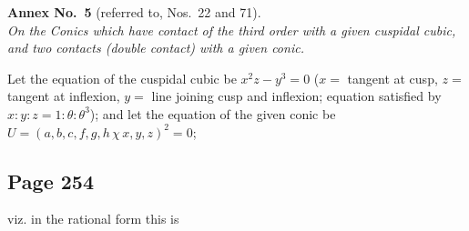 \documentclass[11pt,a4paper]{article}
\theoremstyle{definition}
\begin{document}
\vspace{8pt}
\noindent\textbf{Annex No.~5} (referred to, Nos.~22 and 71).\\
\textit{On the Conics which have contact of the third order with a given cuspidal cubic, and two contacts (double contact) with a given conic.}

Let the equation of the cuspidal cubic be $x^2z - y^3 = 0$ ($x =$ tangent at cusp, $z =$ tangent at inflexion, $y =$ line joining cusp and inflexion; equation satisfied by $x : y : z = 1 : \theta : \theta^3$); and let the equation of the given conic be $U = (a, b, c, f, g, h \,\chi\, x, y, z)^2 = 0$;

\subsection*{Page 254}

viz. in the rational form this is
\end{document}
